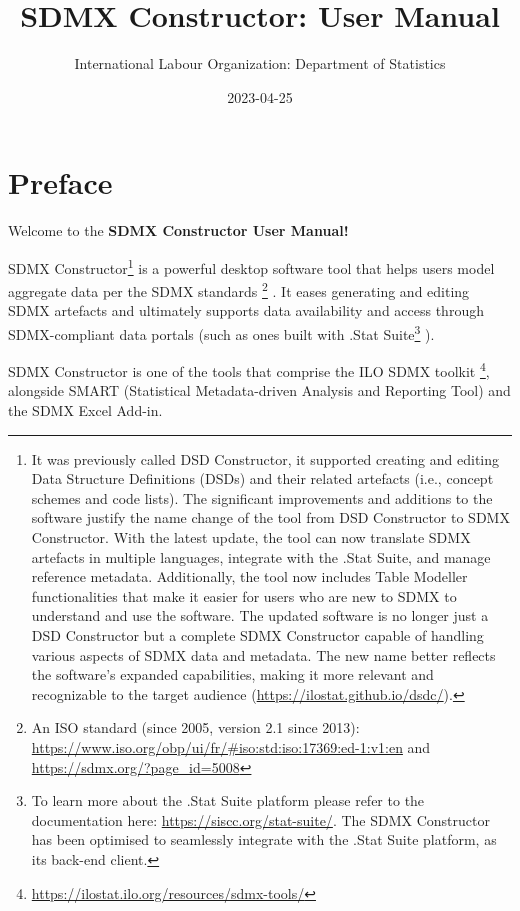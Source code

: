 \documentclass[
]{book}
\title{SDMX Constructor: User Manual}
\author{International Labour Organization: Department of Statistics}
\date{2023-04-25}
\theoremstyle{definition}
\theoremstyle{definition}
\theoremstyle{definition}
\theoremstyle{definition}
\theoremstyle{remark}
\begin{document}
\maketitle

{
\setcounter{tocdepth}{1}
\tableofcontents
}
\hypertarget{preface}{%
\chapter*{Preface}\label{preface}}

Welcome to the \textbf{SDMX Constructor User Manual!}

SDMX Constructor\footnote{It was previously called DSD Constructor, it supported creating and editing Data Structure Definitions (DSDs) and their related artefacts (i.e., concept schemes and code lists). The significant improvements and additions to the software justify the name change of the tool from DSD Constructor to SDMX Constructor. With the latest update, the tool can now translate SDMX artefacts in multiple languages, integrate with the .Stat Suite, and manage reference metadata. Additionally, the tool now includes Table Modeller functionalities that make it easier for users who are new to SDMX to understand and use the software. The updated software is no longer just a DSD Constructor but a complete SDMX Constructor capable of handling various aspects of SDMX data and metadata. The new name better reflects the software's expanded capabilities, making it more relevant and recognizable to the target audience (\url{https://ilostat.github.io/dsdc/}).} is a powerful desktop software tool that helps users model aggregate data per the SDMX standards \footnote{An ISO standard (since 2005, version 2.1 since 2013): \url{https://www.iso.org/obp/ui/fr/\#iso:std:iso:17369:ed-1:v1:en} and \url{https://sdmx.org/?page_id=5008}} . It eases generating and editing SDMX artefacts and ultimately supports data availability and access through SDMX-compliant data portals (such as ones built with .Stat Suite\footnote{To learn more about the .Stat Suite platform please refer to the documentation here: \url{https://siscc.org/stat-suite/}. The SDMX Constructor has been optimised to seamlessly integrate with the .Stat Suite platform, as its back-end client.} ).

SDMX Constructor is one of the tools that comprise the ILO SDMX toolkit \footnote{\url{https://ilostat.ilo.org/resources/sdmx-tools/}}, alongside SMART (Statistical Metadata-driven Analysis and Reporting Tool) and the SDMX Excel Add-in.
\end{document}
